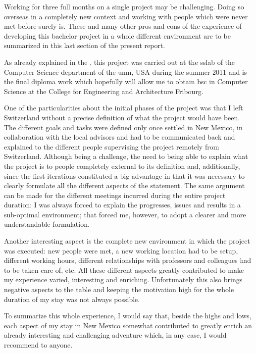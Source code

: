 Working for three full months on a single project may be challenging. Doing so overseas in a completely new context and working with people which were never met before surely is. These and many other pros and cons of the experience of developing this bachelor project in a whole different environment are to be summarized in this last section of the present report.

As already explained in the , this project was carried out at the \gls{sslab} of the Computer Science department of the \gls{unm}, USA during the summer 2011 and is the final diploma work which hopefully will allow me to obtain \gls{bsc} in Computer Science at the College for Engineering and Architecture Fribourg.

One of the particularities about the initial phases of the project was that I left Switzerland without a precise definition of what the project would have been. The different goals and tasks were defined only once settled in New Mexico, in collaboration with the local advisors and had to be communicated back and explained to the different people supervising the project remotely from Switzerland. Although being a challenge, the need to being able to explain what the project is to people completely external to its definition and, additionally, since the first iterations constituted a big advantage in that it was necessary to clearly formulate all the different aspects of the statement. The same argument can be made for the different meetings incurred during the entire project duration: I was always forced to explain the progresses, issues and results in a sub-optimal environment; that forced me, however, to adopt a clearer and more understandable formulation.

Another interesting aspect is the complete new environment in which the project was executed: new people were met, a new working location had to be setup, different working hours, different relationships with professors and colleagues had to be taken care of, etc. All these different aspects greatly contributed to make my experience varied, interesting and enriching. Unfortunately this also brings negative aspects to the table and keeping the motivation high for the whole duration of my stay was not always possible.

To summarize this whole experience, I would say that, beside the highs and lows, each aspect of my stay in New Mexico somewhat contributed to greatly enrich an already interesting and challenging adventure which, in any case, I would recommend to anyone.






